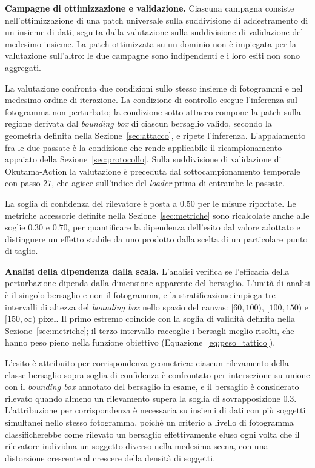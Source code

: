 \ifstampa\documentclass[a4paper,12pt,twoside,openright]{report}\else\documentclass[a4paper,12pt]{report}\fi
\newif\ifrevisione \revisionefalse
\DeclareRobustCommand{\rev}[1]{\ifrevisione{\color{blue!65!black}#1}\else#1\fi}
\begin{document}
\textbf{Campagne di ottimizzazione e validazione.}
\label{sec:campagne}
Ciascuna campagna consiste nell'ottimizzazione di una patch universale sulla
suddivisione di addestramento di un insieme di dati, seguita dalla valutazione
sulla suddivisione di validazione del medesimo insieme. La patch ottimizzata su
un dominio non è impiegata per la valutazione sull'altro: le due campagne sono
indipendenti e i loro esiti non sono aggregati.

La valutazione confronta due condizioni sullo stesso insieme di fotogrammi e nel
medesimo ordine di iterazione. La condizione di controllo esegue l'inferenza sul
fotogramma non perturbato; la condizione sotto attacco compone la patch sulla
regione derivata dal \textit{bounding box} di ciascun bersaglio valido, secondo
la geometria definita nella Sezione~\ref{sec:attacco}, e ripete l'inferenza.
L'appaiamento fra le due passate è la condizione che rende applicabile il
ricampionamento appaiato della Sezione~\ref{sec:protocollo}. Sulla suddivisione
di validazione di Okutama-Action la valutazione è preceduta dal
sottocampionamento temporale con passo $27$, che agisce sull'indice del
\textit{loader} prima di entrambe le passate.

La soglia di confidenza del rilevatore è posta a $0.50$ per le misure riportate.
Le metriche accessorie definite nella Sezione~\ref{sec:metriche} sono
ricalcolate anche alle soglie $0.30$ e $0.70$, per quantificare la dipendenza
dell'esito dal valore adottato e distinguere un effetto stabile da uno prodotto
dalla scelta di un particolare punto di taglio.

\textbf{Analisi della dipendenza dalla scala.}
\label{sec:stratificazione}
L'analisi verifica se l'efficacia della perturbazione dipenda dalla dimensione
apparente del bersaglio. L'unità di analisi è il singolo bersaglio e non il
fotogramma, e la stratificazione impiega tre intervalli di altezza del
\textit{bounding box} nello spazio del canvas: $[60, 100)$, $[100, 150)$ e
$[150, \infty)$ pixel. Il primo estremo coincide con la soglia di validità
definita nella Sezione~\ref{sec:metriche}; il terzo intervallo raccoglie i bersagli meglio risolti, \rev{che hanno peso
pieno nella funzione obiettivo (Equazione~\ref{eq:peso_tattico})}.

L'esito è attribuito per corrispondenza geometrica: ciascun rilevamento della
classe bersaglio sopra soglia di confidenza è confrontato per intersezione su
unione con il \textit{bounding box} annotato del bersaglio in esame, e il
bersaglio è considerato rilevato quando almeno un rilevamento supera la soglia
di sovrapposizione $0.3$. L'attribuzione per corrispondenza è necessaria su
insiemi di dati con più soggetti simultanei nello stesso fotogramma, poiché un
criterio a livello di fotogramma classificherebbe come rilevato un bersaglio
effettivamente eluso ogni volta che il rilevatore individua un soggetto diverso
nella medesima scena, con una distorsione crescente al crescere della densità di
soggetti.
\end{document}
